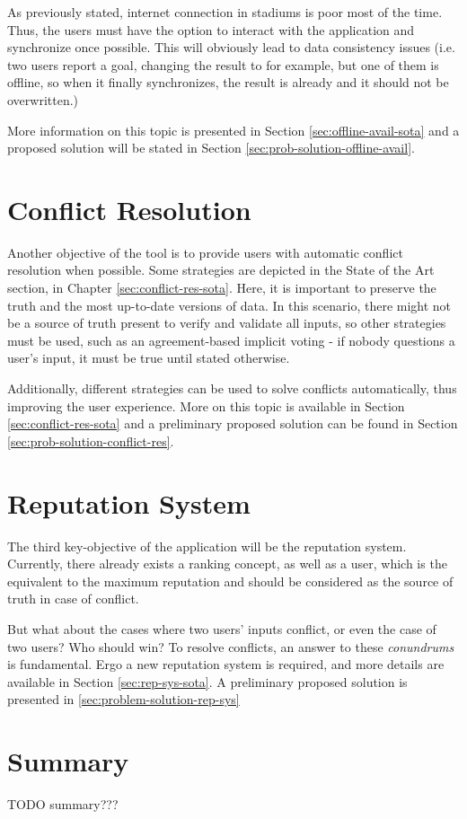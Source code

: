 As previously stated, internet connection in stadiums is poor most of the time. Thus, the users must have the option to interact with the application and synchronize once possible. This will obviously lead to data consistency issues (i.e. two users report a goal, changing the result to  for example, but one of them is offline, so when it finally synchronizes, the result is already  and it should not be overwritten.)

More information on this topic is presented in Section \ref{sec:offline-avail-sota} and a proposed solution will be stated in Section \ref{sec:prob-solution-offline-avail}.

\section{Conflict Resolution} \label{sec:conflict-res-intro}

Another objective of the tool is to provide users with automatic conflict resolution when possible. Some strategies are depicted in the State of the Art section, in Chapter \ref{sec:conflict-res-sota}. Here, it is important to preserve the truth and the most up-to-date versions of data. In this scenario, there might not be a source of truth present to verify and validate all inputs, so other strategies must be used, such as an agreement-based implicit voting - if nobody questions a user's input, it must be true until stated otherwise.

Additionally, different strategies can be used to solve conflicts automatically, thus improving the user experience. More on this topic is available in Section \ref{sec:conflict-res-sota} and a preliminary proposed solution can be found in Section \ref{sec:prob-solution-conflict-res}.

\section{Reputation System} \label{sec:rep-sys-intro}

The third key-objective of the application will be the reputation system. Currently, there already exists a ranking concept, as well as a  user, which is the equivalent to the maximum reputation and should be considered as the source of truth in case of conflict.

But what about the cases where two  users' inputs conflict, or even the case of two  users? Who should win? To resolve conflicts, an answer to these \textit{conundrums} is fundamental. Ergo a new reputation system is required, and more details are available in Section \ref{sec:rep-sys-sota}. A preliminary proposed solution is presented in \ref{sec:problem-solution-rep-sys}

\section{Summary} \label{sec:summary-intro}

TODO summary???
